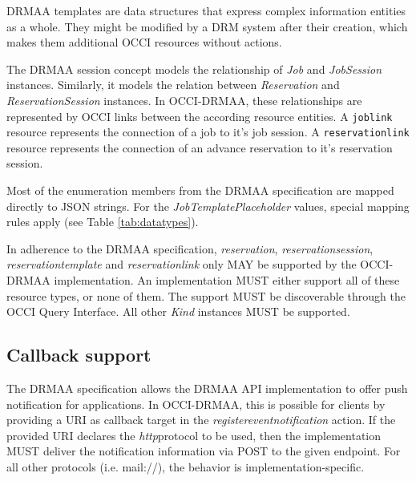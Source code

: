 \documentclass[10pt]{article}
\newcommand{\h}[1]{\lstinline|#1|}
\newcommand{\rat}[1]{}
\begin{document}
DRMAA templates are data structures that express complex information entities as a whole. They might be modified by a DRM system after their creation, which makes them additional OCCI resources without actions.

The DRMAA session concept models the relationship of \emph{Job} and \emph{JobSession} instances. Similarly, it models the relation between \emph{Reservation} and \emph{ReservationSession} instances. In OCCI-DRMAA, these relationships are represented by OCCI links between the according resource entities. A \h{joblink} resource represents the connection of a job to it's job session. A \h{reservationlink} resource represents the connection of an advance reservation to it's reservation session.

\rat{We model the jobsession <-> job relation as OCCI link, especially for using the lifetime model for links. At least Thijs says there is one. Currently, this demands the server to return ALL such links when a resource is retrieved without filtering (see GFD.185, Section 3.4.5). Upcoming OCCI specs will have pagination support for this.}

Most of the enumeration members from the DRMAA specification are mapped directly to JSON strings. For the \emph{JobTemplatePlaceholder} values, special mapping rules apply (see Table \ref{tab:datatypes}).

In adherence to the DRMAA specification, \emph{reservation}, \emph{reservationsession}, \emph{reservationtemplate} and \emph{reservationlink} only MAY be supported by the OCCI-DRMAA implementation. An implementation MUST either support all of these resource types, or none of them. The support MUST be discoverable through the OCCI Query Interface. All other \emph{Kind} instances MUST be supported. 

\subsection{Callback support}

The DRMAA specification allows the DRMAA API implementation to offer push notification for applications. In OCCI-DRMAA, this is possible for clients by providing a URI as callback target in the \emph{registereventnotification} action.  If the provided URI declares the \emph{http}protocol to be used, then the implementation MUST deliver the notification information via POST to the given endpoint. For all other protocols (i.e. mail://), the behavior is implementation-specific.
\end{document}
